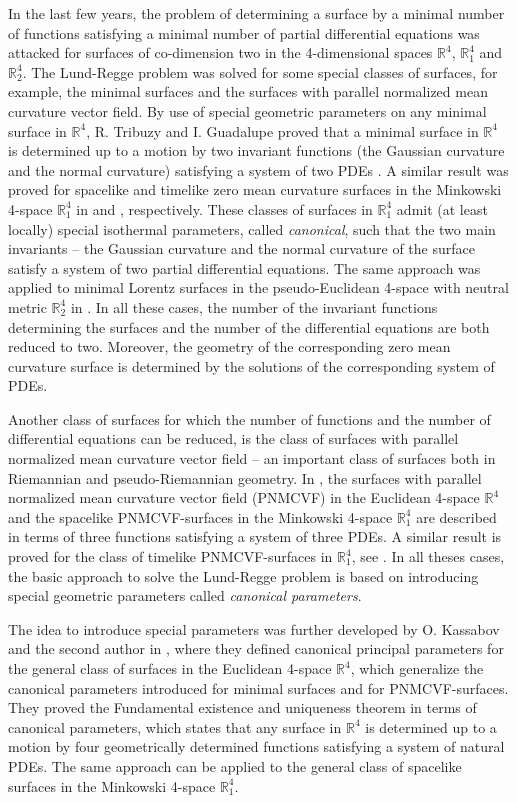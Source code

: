\documentclass[12pt]{amsart}
\newcommand{\R}{\mathbb R}
\theoremstyle{definition}
\theoremstyle{remark}
\numberwithin{equation}{section}
\begin{document}
In the last few years, the problem of determining a surface by a minimal number of functions satisfying a minimal number of partial differential equations was attacked for surfaces of co-dimension two in the 4-dimensional spaces $\R^4$,  $\R_1^4$   and  $\R_2^4$. The Lund-Regge problem was solved for some special classes of surfaces, for example, the minimal surfaces and the surfaces with parallel normalized mean curvature vector field.
By use of special geometric parameters on any minimal surface in  $\R^4$,  R. Tribuzy and I. Guadalupe proved that a minimal surface in  $\R^4$  is determined up to a motion by two invariant functions (the Gaussian curvature and the normal curvature) satisfying a system of two PDEs \cite{Trib-Guad}.  A similar result was proved for spacelike and timelike zero mean curvature surfaces in the Minkowski 4-space $\R^4_1$ in \cite{Al-Pal} and \cite{G-M-IJM}, respectively. These classes of surfaces in  $\R^4_1$  admit (at least locally) special isothermal parameters, called \textit{canonical},  such that the two main invariants -- the Gaussian curvature and the normal curvature of the surface satisfy a system of two partial differential equations. 
The same approach was applied to minimal  Lorentz surfaces in the pseudo-Euclidean 4-space with neutral metric  $\R^4_2$ in \cite{AM-JGP}. In all these cases, the number of the invariant functions determining the surfaces and the number of the differential equations are both reduced to two. Moreover, the geometry of the corresponding zero mean curvature
surface is determined by the solutions of the corresponding system of PDEs.

Another class of surfaces for which the number of functions and the number of differential equations can be reduced, is the class of surfaces with parallel normalized mean curvature vector field -- an important class of surfaces both in Riemannian and pseudo-Riemannian geometry. 
In \cite{G-M-Fil}, the surfaces with parallel normalized mean curvature vector field (PNMCVF) in the Euclidean 4-space $\R^4$ and the spacelike PNMCVF-surfaces in the Minkowski 4-space $\R^4_1$ are described  in terms of three  functions satisfying a system of three PDEs. 
A similar result is proved for the class of  timelike PNMCVF-surfaces in $\R^4_1$, see \cite{B-M}. In all theses cases, the basic  approach to solve the Lund-Regge problem is based on introducing special geometric parameters  called \textit{canonical parameters}. 

The idea to introduce special parameters was further developed by O. Kassabov and the second author in \cite{K-M-2025}, where they defined  canonical principal parameters for the general class of surfaces in the Euclidean 4-space $\R^4$, which generalize the canonical parameters introduced for minimal surfaces and for PNMCVF-surfaces. They proved the Fundamental existence and uniqueness theorem in terms of canonical parameters, which states that any surface in $\R^4$  is determined up to a motion by four geometrically determined functions satisfying a system of natural PDEs. 
The same approach can be applied to the general class of spacelike surfaces in the Minkowski 4-space $\R^4_1$. 
\end{document}
